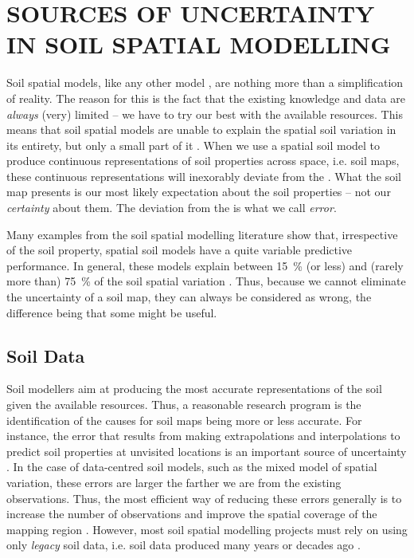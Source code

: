 \section{SOURCES OF UNCERTAINTY IN SOIL SPATIAL MODELLING}

Soil spatial models, like any other model \cite{Box1976}, are nothing more than a simplification of reality. 
The reason for this is the fact that the existing knowledge and data are \emph{always} (very) limited -- we 
have to try our best with the available resources. This means that soil spatial models are unable to explain 
the spatial soil variation in its entirety, but only a small part of it \cite{Heuvelink1998a, Legros2006}. When 
we use a spatial soil model to produce continuous representations of soil properties across space, i.e. soil 
maps, these continuous representations will inexorably deviate from the . What the soil map presents 
is our most likely expectation about the soil properties -- not our \emph{certainty} about them. The deviation 
from the  is what we call \emph{error}.

Many examples from the soil spatial modelling literature show that, irrespective of the soil property, spatial 
soil models have a quite variable predictive performance. In general, these models explain between 
\SI{15}{\percent} (or less) and (rarely more than) \SI{75}{\percent} of the soil spatial variation 
\cite{MooreEtAl1993, OdehEtAl1994, GesslerEtAl1995, McKenzieEtAl1999, GobinEtAl2001, SumflethEtAl2008, 
SunEtAl2012, ViscarraRosselEtAl2013, NussbaumEtAl2014, HenglEtAl2015, GaschEtAl2015, HeungEtAl2016}. Thus, 
because we cannot eliminate the uncertainty of a soil map, they can always be considered as wrong, the 
difference being that some might be useful.

\subsection{Soil Data}
\label{sec:chap02-soil-data}

Soil modellers aim at producing the most accurate representations of the soil given the available resources. 
Thus, a reasonable research program is the identification of the causes for soil maps being more or less 
accurate. For instance, the error that results from making extrapolations and interpolations to predict soil 
properties at unvisited locations is an important source of uncertainty \cite{HeuvelinkEtAl1999, 
RefsgaardEtAl2006}. In the case of data-centred soil models, such as the mixed model of spatial variation, 
these errors are larger the farther we are from the existing observations. Thus, the most efficient way of 
reducing these errors generally is to increase the number of observations and improve the spatial coverage of 
the mapping region \cite{BrusEtAl2007a}. However, most soil spatial modelling projects must rely on using only 
\emph{legacy} soil data, i.e. soil data produced many years or decades ago \cite{KempenEtAl2009, HenglEtAl2014,
PoggioEtAl2014, NussbaumEtAl2014, MulderEtAl2016}.

